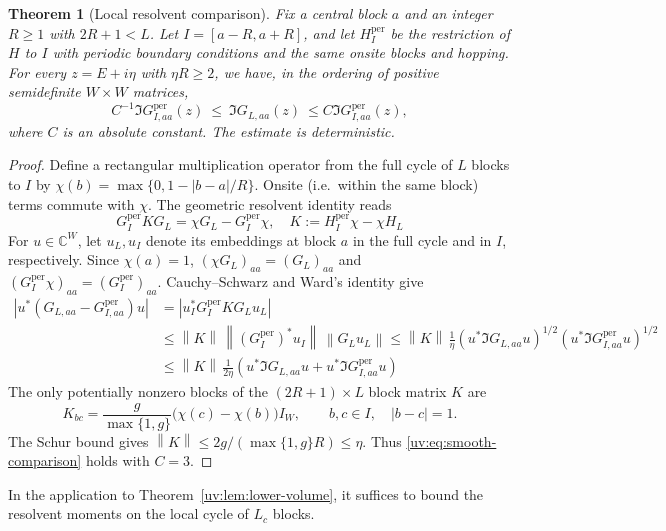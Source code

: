 \documentclass[11pt]{article}
\numberwithin{equation}{section}
\newtheorem{theorem}{Theorem}[section]
\theoremstyle{remark}
\newcommand{\C}{\mathbb C}
\newcommand{\norm}[1]{\left\|#1\right\|}
\begin{document}
\begin{theorem}[Local resolvent comparison]
\label{uv:thm:smooth-cutoff}
Fix a central block $a$ and an integer $R\ge1$ with $2R+1<L$.
Let $I=[a-R,a+R]$, and let $H_I^{\mathrm{per}}$ be the restriction of
$H$ to $I$ with periodic boundary conditions and the same onsite blocks and hopping.
For every $z=E+i\eta$ with $\eta R\ge2$, we have, in the ordering
of positive semidefinite $W\times W$ matrices,
\begin{equation}\label{uv:eq:smooth-comparison}
 C^{-1}\Im G_{I,aa}^{\mathrm{per}}(z)
 \ \le\ \Im G_{L,aa}(z)\
 \le C\Im G_{I,aa}^{\mathrm{per}}(z),
\end{equation}
where $C$ is an absolute constant. The estimate is deterministic.
\end{theorem}
\begin{proof}

Define a rectangular multiplication operator from the full cycle of $L$ blocks
to $I$ by
$\chi(b)=\max\{0,1-|b-a|/R\}$.
Onsite (i.e.\ within the same block) terms commute with $\chi$.
The geometric resolvent identity reads
\[
 G_I^{\mathrm{per}}K G_L
       =\chi G_L-G_I^{\mathrm{per}}\chi, \quad K:=H_I^{\mathrm{per}}\chi-\chi H_L 
\]
For $u\in\C^W$, let $u_L,u_I$ denote its embeddings at block $a$ in the
full cycle and in $I$, respectively. Since $\chi(a)=1$,
$(\chi G_L)_{aa}=(G_L)_{aa}$ and
$(G_I^{\mathrm{per}}\chi)_{aa}=(G_I^{\mathrm{per}})_{aa}$.
Cauchy--Schwarz and Ward's identity give
\[
 \begin{aligned}
 \left|u^*(G_{L,aa}-G_{I,aa}^{\mathrm{per}})u\right|
 &=\left|u_I^*G_I^{\mathrm{per}}KG_Lu_L\right|\\
 &\le\norm K\,\norm{(G_I^{\mathrm{per}})^*u_I}\,\norm{G_Lu_L}
 \le \norm K\, \frac{1}\eta  \left(u^*\Im G_{L,aa}u \right)^{1/2}\left(  u^*\Im G_{I,aa}^{\mathrm{per}}u\right)^{1/2}
 \\
 &\le \norm K\, \frac{1}{2\eta}  \left(u^*\Im G_{L,aa}u  +    u^*\Im G_{I,aa}^{\mathrm{per}}u\right) 
 \end{aligned}
\]
The only potentially nonzero blocks of the $(2R+1)\times L$ block matrix
$K$ are
\[
 K_{bc}=\frac{g}{\max\{1,g\}}\bigl(\chi(c)-\chi(b)\bigr)I_W,
 \qquad b,c\in I,\quad |b-c|=1.
\]
The Schur bound gives $\norm K\le 2g/(\max\{1,g\}R)\le\eta$.
Thus \eqref{uv:eq:smooth-comparison} holds with $C=3$.
\end{proof}

In the application to Theorem~\ref{uv:lem:lower-volume}, it suffices
to bound the resolvent moments on the local cycle of $L_c$ blocks.
\end{document}
